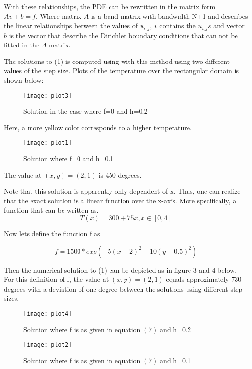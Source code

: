 \documentclass[11pt,a4paper,roman]{scrartcl}
\begin{document}
With these relationships, the PDE can be rewritten in the matrix form $Av +b = f$. Where matrix $A$ is a band matrix with bandwidth N+1 and describes the linear relationships between the values of $u_{i,j}$, $v$ contains the $u_{i,j}s$  and vector $b$ is the vector that describe the Dirichlet boundary conditions that can not be fitted in the $A$ matrix.

The solutions to (1) is computed using with this method using two different values of the step size. Plots of the temperature over the rectangular domain is shown below:

\begin{figure}[h]
\centering
\texttt{[image: plot3]}
\caption{Solution in the case where f=0 and h=0.2}
\end{figure}
Here, a more yellow color corresponds to a higher temperature.
\begin{figure}[!htbp]
\centering
\texttt{[image: plot1]}
\caption{Solution where f=0 and h=0.1}
\end{figure}

The value at $(x,y)=(2,1)$ is 450 degrees. 


Note that this solution is apparently only dependent of x. Thus, one can realize that the exact solution is a linear function over the x-axis. More specifically, a function that can be written as.
\begin{equation}
T(x)=300+75x, x\in [0,4]
\end{equation}


Now lets define the function f as

\begin{equation}
          f=1500*exp(-5(x-2)^2-10(y-0.5)^2)
          \label{Eq1}
\end{equation}

Then the numerical solution to (1) can be depicted as in figure 3 and 4 below. For this definition of f, the value at $(x,y)=(2,1)$ equals approximately 730 degrees with a deviation of one degree between the solutions using different step sizes. 

\begin{figure}[h]
\centering
\texttt{[image: plot4]}
\caption{Solution where f is as given in equation $(7)$ and h=0.2}
\end{figure}

\begin{figure}[h]
\centering
\texttt{[image: plot2]}
\caption{Solution where f is as given in equation $(7)$ and h=0.1}
\end{figure}
\end{document}
